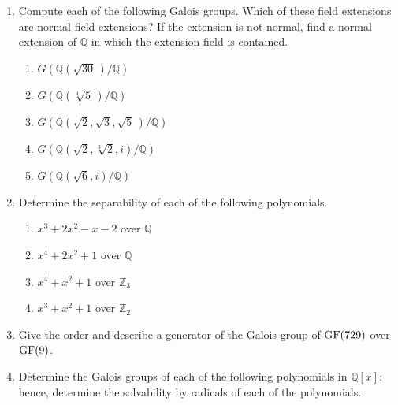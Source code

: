  
{\small
\begin{enumerate}
 
 
\item
Compute each of the following Galois groups. Which of these field
extensions are normal field extensions? If the extension is not
normal, find a normal extension of ${\mathbb Q}$ in which the extension
field is contained.
\begin{multicols}{2}
\begin{enumerate}

\item 
$G({\mathbb Q}(\sqrt{30}\, ) / {\mathbb Q})$

\item 
$G({\mathbb Q}(\sqrt[4]{5}\, ) / {\mathbb Q})$

\item 
$G( {\mathbb Q}(\sqrt{2}, \sqrt{3}, \sqrt{5}\, )/ {\mathbb Q} )$

\item 
$G({\mathbb Q}(\sqrt{2}, \sqrt[3]{2}, i) / {\mathbb Q})$

\item 
$G({\mathbb Q}(\sqrt{6}, i) / {\mathbb Q})$


\end{enumerate}

\end{multicols}
 

 
 
\item
Determine the separability of each of the following polynomials.
\begin{multicols}{2}
\begin{enumerate}

\item 
$x^3 + 2 x^2 - x - 2$ over ${\mathbb Q}$

\item 
$x^4 + 2 x^2 + 1$ over ${\mathbb Q}$

\item 
$x^4 + x^2 + 1$ over ${\mathbb Z}_3$

\item 
$x^3 +x^2 + 1$ over ${\mathbb Z}_2$

\end{enumerate}
\end{multicols}
 

\item
Give the order and describe a generator of the Galois group of
$\operatorname{GF}(729)$ over~$\operatorname{GF}(9)$.

 
\item
Determine the Galois groups of each of the following polynomials in
${\mathbb Q}[x]$; hence, determine the solvability by radicals of each 
of the polynomials.
\begin{multicols}{2}
\begin{enumerate}


\end{enumerate}
\end{multicols}
\end{enumerate}}
